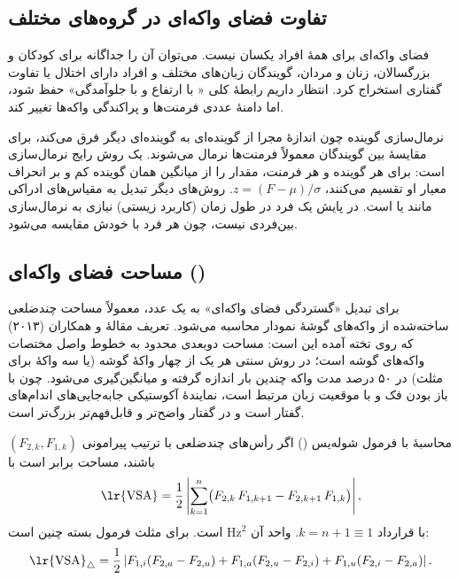 \subsection{تفاوت فضای واکه‌ای در گروه‌های مختلف}
فضای واکه‌ای برای همهٔ افراد یکسان نیست. می‌توان آن را جداگانه برای کودکان و بزرگسالان، زنان و مردان، گویندگان زبان‌های مختلف و افراد دارای اختلال یا تفاوت گفتاری استخراج کرد. انتظار داریم رابطهٔ کلی « با ارتفاع و  با جلوآمدگی» حفظ شود، اما دامنهٔ عددی فرمنت‌ها و پراکندگی واکه‌ها تغییر کند.

\begin{addedbox}{نرمال‌سازی گوینده}
چون اندازهٔ مجرا از گوینده‌ای به گوینده‌ای دیگر فرق می‌کند، برای مقایسهٔ بین گویندگان معمولاً فرمنت‌ها نرمال می‌شوند. یک روش رایج نرمال‌سازی  است: برای هر گوینده و هر فرمنت، مقدار را از میانگین همان گوینده کم و بر انحراف معیار او تقسیم می‌کنند، $z=(F-\mu)/\sigma$. روش‌های دیگر تبدیل به مقیاس‌های ادراکی مانند  یا  است. در پایش یک فرد در طول زمان (کاربرد زیستی) نیازی به نرمال‌سازی بین‌فردی نیست، چون هر فرد با خودش مقایسه می‌شود.
\end{addedbox}

\subsection{مساحت فضای واکه‌ای ()}
برای تبدیل «گستردگی فضای واکه‌ای» به یک عدد، معمولاً مساحت چندضلعی ساخته‌شده از واکه‌های گوشهٔ نمودار  محاسبه می‌شود. تعریف مقالهٔ  و همکاران (۲۰۱۳) که روی تخته آمده این است:  مساحت دوبعدی محدود به خطوط واصل مختصات  واکه‌های گوشه است؛ در روش سنتی  هر یک از چهار واکهٔ گوشه (یا سه واکهٔ  برای مثلث) در ۵۰ درصد مدت واکه چندین بار اندازه گرفته و میانگین‌گیری می‌شود. چون  با باز بودن فک و  با موقعیت زبان مرتبط است،  نمایندهٔ آکوستیکی جابه‌جایی‌های اندام‌های گفتار است و در گفتار واضح‌تر و قابل‌فهم‌تر بزرگ‌تر است.


\begin{definitionbox}{محاسبهٔ  با فرمول شوله‌یس ()}
اگر رأس‌های چندضلعی با ترتیب پیرامونی $(F_{2,k},F_{1,k})$ باشند، مساحت برابر است با
\[
\text{\lr{VSA}}=\frac12\left|\sum_{k=1}^{n}\bigl(F_{2,k}\,F_{1,k+1}-F_{2,k+1}\,F_{1,k}\bigr)\right|,
\]
با قرارداد $k=n+1\equiv 1$. واحد آن $\text{Hz}^2$ است. برای مثلث  فرمول بسته چنین است:
\[
\text{\lr{VSA}}_{\triangle}=\frac12\left|F_{1,i}(F_{2,a}-F_{2,u})+F_{1,a}(F_{2,u}-F_{2,i})+F_{1,u}(F_{2,i}-F_{2,a})\right|.
\]
\end{definitionbox}

